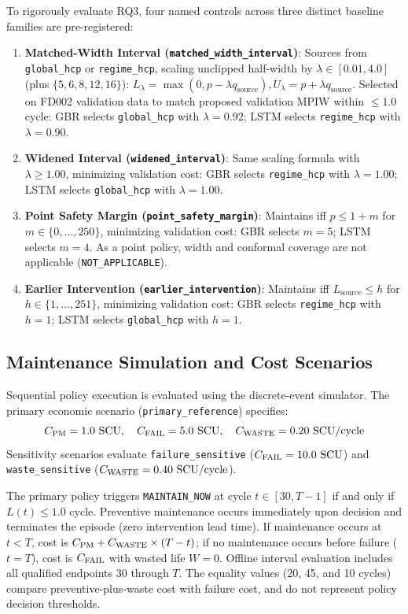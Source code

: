 To rigorously evaluate RQ3, four named controls across three distinct baseline families are pre-registered:
\begin{enumerate}
    \item \textbf{Matched-Width Interval (\texttt{matched\_width\_interval})}: Sources from \texttt{global\_hcp} or \texttt{regime\_hcp}, scaling unclipped half-width by $\lambda \in [0.01, 4.0]$ (plus $\{5, 6, 8, 12, 16\}$): $L_\lambda = \max(0, p - \lambda q_{\text{source}}), U_\lambda = p + \lambda q_{\text{source}}$. Selected on FD002 validation data to match proposed validation MPIW within $\le 1.0$ cycle: GBR selects \texttt{global\_hcp} with $\lambda=0.92$; LSTM selects \texttt{regime\_hcp} with $\lambda=0.90$.
    \item \textbf{Widened Interval (\texttt{widened\_interval})}: Same scaling formula with $\lambda \ge 1.00$, minimizing validation cost: GBR selects \texttt{regime\_hcp} with $\lambda=1.00$; LSTM selects \texttt{global\_hcp} with $\lambda=1.00$.
    \item \textbf{Point Safety Margin (\texttt{point\_safety\_margin})}: Maintains iff $p \le 1 + m$ for $m \in \{0, \dots, 250\}$, minimizing validation cost: GBR selects $m=5$; LSTM selects $m=4$. As a point policy, width and conformal coverage are not applicable (\texttt{NOT\_APPLICABLE}).
    \item \textbf{Earlier Intervention (\texttt{earlier\_intervention})}: Maintains iff $L_{\text{source}} \le h$ for $h \in \{1, \dots, 251\}$, minimizing validation cost: GBR selects \texttt{regime\_hcp} with $h=1$; LSTM selects \texttt{global\_hcp} with $h=1$.
\end{enumerate}

\subsection{Maintenance Simulation and Cost Scenarios}
Sequential policy execution is evaluated using the discrete-event simulator. The primary economic scenario (\texttt{primary\_reference}) specifies:
\begin{equation}
C_{\text{PM}} = 1.0~\text{SCU}, \quad C_{\text{FAIL}} = 5.0~\text{SCU}, \quad C_{\text{WASTE}} = 0.20~\text{SCU}/\text{cycle}
\end{equation}
Sensitivity scenarios evaluate \texttt{failure\_sensitive} ($C_{\text{FAIL}}=10.0~\text{SCU}$) and \texttt{waste\_sensitive} ($C_{\text{WASTE}}=0.40~\text{SCU}/\text{cycle}$). 

The primary policy triggers \texttt{MAINTAIN\_NOW} at cycle $t \in [30, T-1]$ if and only if $L(t) \le 1.0$ cycle. Preventive maintenance occurs immediately upon decision and terminates the episode (zero intervention lead time). If maintenance occurs at $t < T$, cost is $C_{\text{PM}} + C_{\text{WASTE}} \times (T - t)$; if no maintenance occurs before failure ($t=T$), cost is $C_{\text{FAIL}}$ with wasted life $W=0$. Offline interval evaluation includes all qualified endpoints $30$ through $T$. The equality values (20, 45, and 10 cycles) compare preventive-plus-waste cost with failure cost, and do not represent policy decision thresholds.

